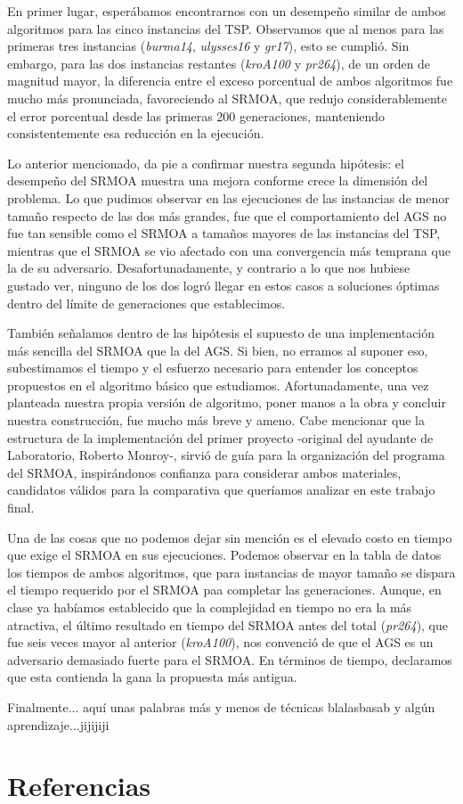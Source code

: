 \documentclass[12pt]{article}
\begin{document}
En primer lugar, esperábamos encontrarnos con un desempeño similar de ambos algoritmos para las cinco instancias del TSP. Observamos que al menos para las primeras tres instancias (\textit{burma14}, \textit{ulysses16} y \textit{gr17}), esto se cumplió. Sin embargo, para las dos instancias restantes (\textit{kroA100} y \textit{pr264}), de un orden de magnitud mayor, la diferencia entre el exceso porcentual de ambos algoritmos fue mucho más pronunciada, favoreciendo al SRMOA, que redujo considerablemente el error porcentual desde las primeras 200 generaciones, manteniendo consistentemente esa reducción en la ejecución.

Lo anterior mencionado, da pie a confirmar nuestra segunda hipótesis: el desempeño del SRMOA muestra una mejora conforme crece la dimensión del problema. Lo que pudimos observar en las ejecuciones de las instancias de menor tamaño respecto de las dos más grandes, fue que el comportamiento del AGS no fue tan sensible como el SRMOA a tamaños mayores de las instancias del TSP, mientras que el SRMOA se vio afectado con una convergencia más temprana que la de su adversario. Desafortunadamente, y contrario a lo que nos hubiese gustado ver, ninguno de los dos logró llegar en estos casos a soluciones óptimas dentro del límite de generaciones que establecimos.

También señalamos dentro de las hipótesis el supuesto de una implementación más sencilla del SRMOA que la del AGS. Si bien, no erramos al suponer eso, subestimamos el tiempo y el esfuerzo necesario para entender los conceptos propuestos en el algoritmo básico que estudiamos. Afortunadamente, una vez planteada nuestra propia versión de algoritmo, poner manos a la obra y concluir nuestra construcción, fue mucho más breve y ameno. Cabe mencionar que la estructura de la implementación del primer proyecto -original del ayudante de Laboratorio, Roberto Monroy-, sirvió de guía para la organización del programa del SRMOA, inspirándonos confianza para considerar ambos materiales, candidatos válidos para la comparativa que queríamos analizar en este trabajo final.

Una de las cosas que no podemos dejar sin mención es el elevado costo en tiempo que exige el SRMOA en sus ejecuciones. Podemos observar en la tabla de datos los tiempos de ambos algoritmos, que para instancias de mayor tamaño se dispara el tiempo requerido por el SRMOA paa completar las generaciones. Aunque, en clase ya habíamos establecido que la complejidad en tiempo no era la más atractiva, el último resultado en tiempo del SRMOA antes del total (\textit{pr264}), que fue seis veces mayor al anterior (\textit{kroA100}), nos convenció de que el AGS es un adversario
demasiado fuerte para el SRMOA. En términos de tiempo, declaramos que esta contienda la gana la propuesta más antigua.

Finalmente... aquí unas palabras más y menos de técnicas blalasbasab
y algún aprendizaje...jijijiji


\newpage

\section{Referencias}
\end{document}
